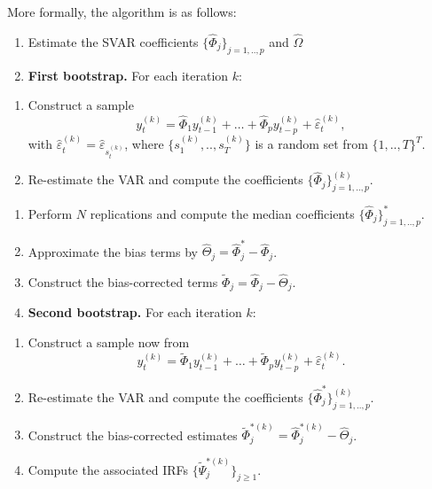 \documentclass[
  12pt,
]{book}
\providecommand{\tightlist}{%
  \setlength{\itemsep}{0pt}\setlength{\parskip}{0pt}}
\theoremstyle{definition}
\theoremstyle{definition}
\theoremstyle{definition}
\theoremstyle{definition}
\theoremstyle{remark}
\begin{document}
More formally, the algorithm is as follows:

\begin{enumerate}
\def\labelenumi{\arabic{enumi}.}
\tightlist
\item
  Estimate the SVAR coefficients \(\{\widehat{\Phi}_j\}_{j=1,..,p}\) and \(\widehat{\Omega}\)
\item
  \textbf{First bootstrap.} For each iteration \(k\):
\end{enumerate}

\begin{enumerate}
\def\labelenumi{\alph{enumi}.}
\tightlist
\item
  Construct a sample
  \[
  y_t^{(k)}=\widehat{\Phi}_1 y_{t-1}^{(k)} + \dots + \widehat{\Phi}_p y_{t-p}^{(k)} + \hat\varepsilon_t^{(k)},
  \]
  with \(\hat\varepsilon_{t}^{(k)}=\hat\varepsilon_{s_t^{(k)}}\), where \(\{s_1^{(k)},..,s_T^{(k)}\}\) is a random set from \(\{1,..,T\}^T\).
\item
  Re-estimate the VAR and compute the coefficients \(\{\widehat{\Phi}_j\}_{j=1,..,p}^{(k)}\).
\end{enumerate}

\begin{enumerate}
\def\labelenumi{\arabic{enumi}.}
\setcounter{enumi}{2}
\tightlist
\item
  Perform \(N\) replications and compute the median coefficients \(\{\widehat{\Phi}_j\}_{j=1,..,p}^*\).
\item
  Approximate the bias terms by \(\widehat{\Theta}_j=\widehat{\Phi}_j^*-\widehat{\Phi}_j\).
\item
  Construct the bias-corrected terms \(\widetilde{\Phi}_j=\widehat{\Phi}_j-\widehat{\Theta}_j\).
\item
  \textbf{Second bootstrap.} For each iteration \(k\):
\end{enumerate}

\begin{enumerate}
\def\labelenumi{\alph{enumi}.}
\tightlist
\item
  Construct a sample now from
  \[
  y_t^{(k)}=\widetilde{\Phi}_1 y_{t-1}^{(k)} + \dots + \widetilde{\Phi}_p y_{t-p}^{(k)} + \hat\varepsilon_t^{(k)}.
  \]
\item
  Re-estimate the VAR and compute the coefficients \(\{\widehat{\Phi}^*_j\}_{j=1,..,p}^{(k)}\).
\item
  Construct the bias-corrected estimates \(\widetilde{\Phi}_j^{*(k)}=\widehat{\Phi}_j^{*(k)}-\widehat{\Theta}_j\).
\item
  Compute the associated IRFs \(\{\widetilde{\Psi}_j^{*(k)}\}_{j\ge 1}\).
\end{enumerate}
\end{document}

